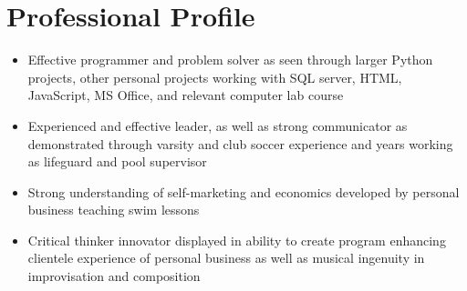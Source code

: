 \documentclass[letterpaper]{deedy-resume} %
\begin{document}
\lastupdated



\section{Professional Profile}
\begin{itemize}
    \item Effective programmer and problem solver as seen through larger Python projects, other personal projects working with SQL server, HTML, JavaScript, MS Office,
    and relevant computer lab course
    
    \vspace{-5pt}
    
    \item Experienced and effective leader, as well as strong communicator as demonstrated through varsity and club soccer experience and years working as lifeguard and pool supervisor
    \vspace{-5pt}
    \item Strong understanding of self-marketing and economics developed by personal business teaching swim lessons 
        

        \vspace{-5pt}
        
        \item Critical thinker innovator displayed in ability to create program enhancing clientele experience of personal business as well as musical ingenuity in improvisation and composition 

        
\end{itemize}
\end{document}
